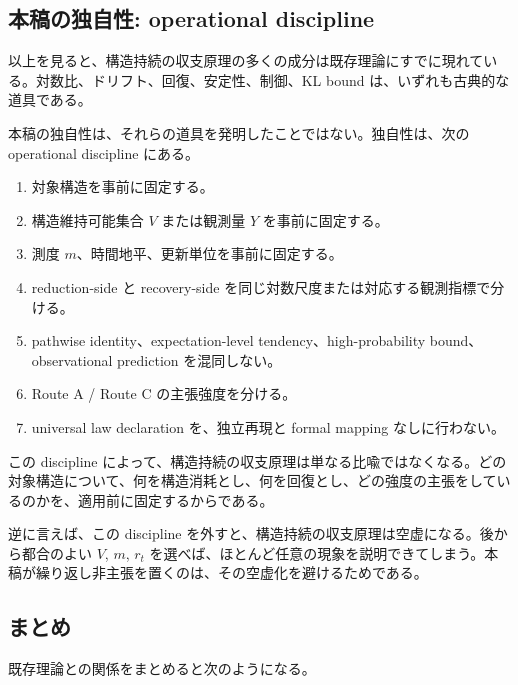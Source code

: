 \documentclass[12pt,a4paper]{article}
\begin{document}
\subsection{本稿の独自性: operational discipline}\label{ux672cux7a3fux306eux72ecux81eaux6027-operational-discipline}

以上を見ると、構造持続の収支原理の多くの成分は既存理論にすでに現れている。対数比、ドリフト、回復、安定性、制御、KL bound は、いずれも古典的な道具である。

本稿の独自性は、それらの道具を発明したことではない。独自性は、次の operational discipline にある。

\begin{enumerate}
\def\labelenumi{\arabic{enumi}.}
\tightlist
\item
  対象構造を事前に固定する。
\item
  構造維持可能集合 \(V\) または観測量 \(Y\) を事前に固定する。
\item
  測度 \(m\)、時間地平、更新単位を事前に固定する。
\item
  reduction-side と recovery-side を同じ対数尺度または対応する観測指標で分ける。
\item
  pathwise identity、expectation-level tendency、high-probability bound、observational prediction を混同しない。
\item
  Route A / Route C の主張強度を分ける。
\item
  universal law declaration を、独立再現と formal mapping なしに行わない。
\end{enumerate}

この discipline によって、構造持続の収支原理は単なる比喩ではなくなる。どの対象構造について、何を構造消耗とし、何を回復とし、どの強度の主張をしているのかを、適用前に固定するからである。

逆に言えば、この discipline を外すと、構造持続の収支原理は空虚になる。後から都合のよい \(V\), \(m\), \(r_{t}\) を選べば、ほとんど任意の現象を説明できてしまう。本稿が繰り返し非主張を置くのは、その空虚化を避けるためである。

\subsection{まとめ}\label{ux307eux3068ux3081}

既存理論との関係をまとめると次のようになる。
\end{document}
